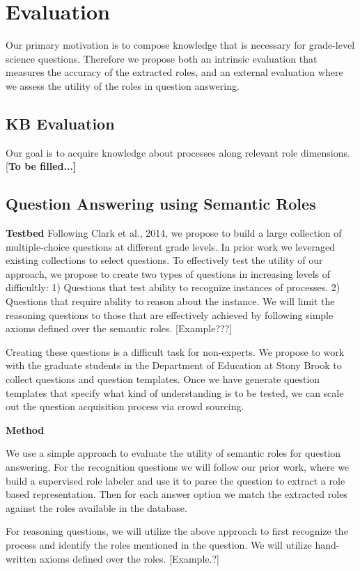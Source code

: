 \section{Evaluation}

Our primary motivation is to compose knowledge that is necessary for grade-level science questions.
Therefore we propose both an intrinsic evaluation that measures the accuracy of the extracted roles, and an external evaluation where we assess the utility of the roles in question answering.

\subsection{KB Evaluation}

Our goal is to acquire knowledge about processes along relevant role dimensions.
[{\bf To be filled...]}


\subsection{Question Answering using Semantic Roles}

{\bf Testbed}
Following Clark et al., 2014, we propose to build a large collection of multiple-choice questions at different grade levels. 
In prior work we leveraged existing collections to select questions. 
To effectively test the utility of our approach, we propose to create two types of questions in increasing levels of difficultly: 1) Questions that test ability to recognize instances of processes. 2) Questions that require ability to reason about the instance. We will limit the reasoning questions to those that are effectively achieved by following simple axioms defined over the semantic roles. [Example???]

Creating these questions is a difficult task for non-experts. We propose to work with the graduate students in the Department of Education at Stony Brook to collect questions and question templates. 
Once we have generate question templates that specify what kind of understanding is to be tested, we can scale out the question acquisition process via crowd sourcing. 

{\bf Method}

We use a simple approach to evaluate the utility of semantic roles for question answering. 
For the recognition questions we will follow our prior work, where we build a supervised role labeler 
and use it to parse the question to extract a role based representation. 
Then for each answer option we match the extracted roles against the roles available in the database. 

For reasoning questions, we will utilize the above approach to first recognize the process and identify the roles mentioned in the question. We will utilize hand-written axioms defined over the roles. [Example.?]


